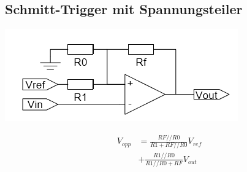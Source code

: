 \subsection{Schmitt-Trigger mit Spannungsteiler}
\begin{minipage}{0.20\textwidth}
	\includegraphics[width=\linewidth,keepaspectratio=true]{./Images/screenshot002}
\end{minipage}%
\begin{minipage}{0.30\textwidth}
	\begin{align*}
		V_{opp} &= \frac{RF//R0}{R1 + RF//R0}V_{ref}  \\
		&+ \frac{R1//R0}{R1//R0 + RF}V_{out}
	\end{align*}
\end{minipage}

